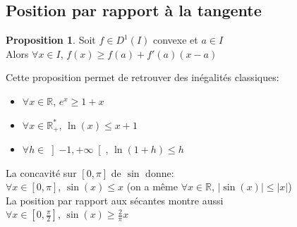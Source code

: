 \documentclass[10pt,a4paper]{article}
\theoremstyle{definition}
\newtheorem{proposition}{Proposition}[section]
\begin{document}
\subsection{Position par rapport à la tangente}
\begin{proposition}
Soit $f \in D^1(I)$ convexe et $a \in I$ \\
Alors $\forall x \in I$, $f(x) \geq f(a) + f'(a)(x - a)$
\end{proposition}
\noindent Cette proposition permet de retrouver des inégalités classiques:
\begin{itemize}
\item $\forall x \in \mathbb{R}$, $e^x \geq 1 + x$
\item $\forall x \in \mathbb{R}_+^*$, $\ln(x) \leq x + 1$
\item $\forall h \in \left]-1, +\infty\right[$, $\ln(1 + h) \leq h$
\end{itemize}
La concavité sur $[0, \pi]$ de $\sin$ donne: \\
$\forall x \in [0, \pi]$, $\sin(x) \leq x$ (on a même $\forall x \in \mathbb{R}$, $|\sin(x)| \leq |x|$) \\
La position par rapport aux sécantes montre aussi \\
$\forall x \in \left[0, \frac{\pi}{2}\right]$, $\sin(x) \geq \frac{2}{\pi} x$
\end{document}
